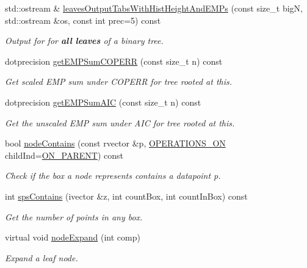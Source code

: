 \begin{DoxyCompactItemize}
std\-::ostream \& \hyperlink{classsubpavings_1_1SPSnode_a24b8bd122c6509dd0bdb1d11b52edb7a}{leaves\-Output\-Tabs\-With\-Hist\-Height\-And\-E\-M\-Ps} (const size\-\_\-t big\-N, std\-::ostream \&os, const int prec=5) const 
\begin{DoxyCompactList}\small\item\em \-Output for for {\bfseries all leaves} of a binary tree. \end{DoxyCompactList}\item 
dotprecision \hyperlink{classsubpavings_1_1SPSnode_ad8b17faf69caa46fcfa021b61d09e278}{get\-E\-M\-P\-Sum\-C\-O\-P\-E\-R\-R} (const size\-\_\-t n) const 
\begin{DoxyCompactList}\small\item\em \-Get scaled \-E\-M\-P sum under \-C\-O\-P\-E\-R\-R for tree rooted at this. \end{DoxyCompactList}\item 
dotprecision \hyperlink{classsubpavings_1_1SPSnode_a26329c8ddf55f351a673fe258e5abd15}{get\-E\-M\-P\-Sum\-A\-I\-C} (const size\-\_\-t n) const 
\begin{DoxyCompactList}\small\item\em \-Get the unscaled \-E\-M\-P sum under \-A\-I\-C for tree rooted at this. \end{DoxyCompactList}\item 
bool \hyperlink{classsubpavings_1_1SPSnode_a918067afb150c053f7450fd18c6ecd22}{node\-Contains} (const rvector \&p, \hyperlink{namespacesubpavings_ae1ea349cda4812634df03761ebfc1c98}{\-O\-P\-E\-R\-A\-T\-I\-O\-N\-S\-\_\-\-O\-N} child\-Ind=\hyperlink{namespacesubpavings_ae1ea349cda4812634df03761ebfc1c98a4863db89a4712e90bb113f9acf898781}{\-O\-N\-\_\-\-P\-A\-R\-E\-N\-T}) const 
\begin{DoxyCompactList}\small\item\em \-Check if the box a node represents contains a datapoint p. \end{DoxyCompactList}\item 
int \hyperlink{classsubpavings_1_1SPSnode_a1ac36ca4768f69aab39ae45aaace5988}{sps\-Contains} (ivector \&z, int count\-Box, int count\-In\-Box) const 
\begin{DoxyCompactList}\small\item\em \-Get the number of points in any box. \end{DoxyCompactList}\item 
virtual void \hyperlink{classsubpavings_1_1SPSnode_adf0575b58b84a0910a8d5b67b6ec0f48}{node\-Expand} (int comp)
\begin{DoxyCompactList}\small\item\em \-Expand a leaf node. \end{DoxyCompactList}\item 

\end{DoxyCompactItemize}

